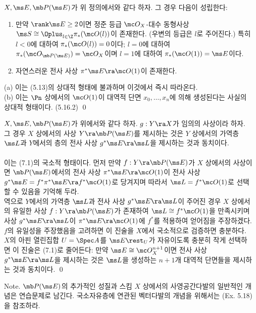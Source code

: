 	
	\begin{proposition}
	$X,\ms E,\mb P(\ms E)$가 위 정의에서와 같다 하자. 그 경우 다음이 성립한다:
	\begin{enumerate}[label=(\alph*)]
	\item 만약 $\rank\ms E\ge 2$이면 정준 등급 $\mc O_X$-대수 동형사상 $\ms S\cong\Oplus_{l\in\Z}\pi_*(\mc O(l))$이 존재한다.
	(우변의 등급은 $l$로 주어진다.) 특히 $l<0$에 대하여 $\pi_*(\mc O(l))=0$이다;
	$l=0$에 대하여 $\pi_*(\mc O_{\mb P(\ms E)})=\mc O_X$이며 $l=1$에 대하여 $\pi_*(\mc O(1))=\ms E$이다.
	\item 자연스러운 전사 사상 $\pi^*\ms E\ra\mc O(1)$이 존재한다.\\
	\end{enumerate}
	\pf (a) 이는 (5.13)의 상대적 형태에 불과하며 이것에서 즉시 따라온다.\\
	(b) 이는 $\Pn$ 상에서의 $\mc O(1)$이 대역적 단면 $x_0,\ldots,x_n$에 의해 생성된다는 사실의 상대적 형태이다. (5.16.2)
	\qed
	\end{proposition}
	
	
	\begin{proposition}
	$X,\ms E,\mb P(\ms E)$가 위에서와 같다 하자. $g:Y\ra X$가 임의의 사상이라 하자.
	그 경우 $X$ 상에서의 사상 $Y\ra\mb P(\ms E)$를 제시하는 것은
	$Y$ 상에서의 가역층 $\ms L$과 $Y$에서의 층의 전사 사상 $g^*\ms E\ra\ms L$을 제시하는 것과 동치이다.\\\\
	\pf 이는 (7.1)의 국소적 형태이다. 먼저 만약 $f:Y\ra\mb P(\ms E)$가 $X$ 상에서의 사상이면
	$\mb P(\ms E)$에서의 전사 사상 $\pi^*\ms E\ra\mc O(1)$이 전사 사상 $g^*\ms E=f^*\pi^*\ms E\ra f^*\mc O(1)$로 당겨지며
	따라서 $\ms L=f^*\mc O(1)$로 선택할 수 있음을 기억해 두라.\\
	역으로 $Y$에서의 가역층 $\ms L$과 전사 사상 $g^*\ms E\ra\ms L$이 주어진 경우
	$X$ 상에서의 유일한 사상 $f:Y\ra\mb P(\ms E)$가 존재하여 $\ms L\cong f^*\mc O(1)$을 만족시키며
	사상 $g^*\ms E\ra\ms L$이 $\pi^*\ms E\ra\mc O(1)$에 $f^*$를 적용하여 얻어짐을 주장하겠다.
	$f$의 유일성을 주장했음을 고려하면 이 진술을 $X$에서 국소적으로 검증하면 충분하다.
	$X$의 아핀 열린집합 $U=\Spec A$를 $\ms E\rest_U$가 자유이도록 충분히 작게 선택하면 이 진술은 (7.1)로 줄어든다:
	만약 $\ms E\cong\mc O_X^{n+1}$이면 전사 사상 $g^*\ms E\ra\ms L$을 제시하는 것은
	$\ms L$을 생성하는 $n+1$개 대역적 단면들을 제시하는 것과 동치이다.
	\qed
	\end{proposition}
	
	Note. $\mb P(\ms E)$의 추가적인 성질과 스킴 $X$ 상에서의 사영공간다발의 일반적인 개념은 연습문제로 남긴다.
	국소자유층에 연관된 벡터다발의 개념을 위해서는 (Ex. 5.18)을 참조하라.\\
	
